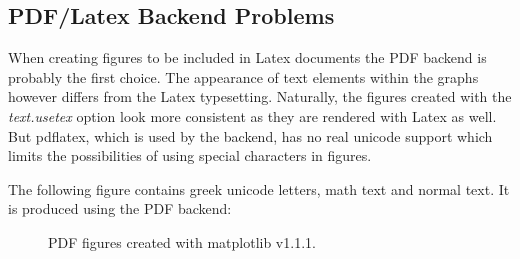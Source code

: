 \documentclass[12pt, a4paper]{article}
\begin{document}
\subsection*{PDF/Latex Backend Problems}

When creating figures to be included in Latex documents the PDF backend is probably the first choice. The appearance of text elements within the graphs however differs from the Latex typesetting. Naturally, the figures created with the \textit{text.usetex} option look more consistent as they are rendered with Latex as well. But pdflatex, which is used by the backend, has no real unicode support which limits the possibilities of using special characters in figures.

The following figure contains greek unicode letters, math text and normal text. It is produced using the PDF backend:

\begin{figure}[h]
\hspace{1mm}
\caption{PDF figures created with matplotlib v1.1.1.}
\end{figure}
\end{document}
